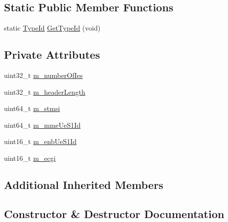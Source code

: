 \subsection*{Static Public Member Functions}
\begin{DoxyCompactItemize}
\item 
static \hyperlink{classns3_1_1TypeId}{Type\+Id} \hyperlink{classns3_1_1EpcS1APInitialUeMessageHeader_a1210d4815f5578cdd98bb8921221199c}{Get\+Type\+Id} (void)
\end{DoxyCompactItemize}
\subsection*{Private Attributes}
\begin{DoxyCompactItemize}
\item 
uint32\+\_\+t \hyperlink{classns3_1_1EpcS1APInitialUeMessageHeader_ac1ee41c38988ec5fbadaf31e3a906ae0}{m\+\_\+number\+Of\+Ies}
\item 
uint32\+\_\+t \hyperlink{classns3_1_1EpcS1APInitialUeMessageHeader_a50b3b61ac108d11bc42e2dd51e1ecf35}{m\+\_\+header\+Length}
\item 
uint64\+\_\+t \hyperlink{classns3_1_1EpcS1APInitialUeMessageHeader_a95613bbcb4e243a00cb6972296d19067}{m\+\_\+stmsi}
\item 
uint64\+\_\+t \hyperlink{classns3_1_1EpcS1APInitialUeMessageHeader_a356831c08e73baf7a38163bf81c228c8}{m\+\_\+mme\+Ue\+S1\+Id}
\item 
uint16\+\_\+t \hyperlink{classns3_1_1EpcS1APInitialUeMessageHeader_a236fa237b7be551f37baf0d11f1d1ee6}{m\+\_\+enb\+Ue\+S1\+Id}
\item 
uint16\+\_\+t \hyperlink{classns3_1_1EpcS1APInitialUeMessageHeader_a53c7af632e6a6ab097ba6ac764eea0ad}{m\+\_\+ecgi}
\end{DoxyCompactItemize}
\subsection*{Additional Inherited Members}


\subsection{Constructor \& Destructor Documentation}
